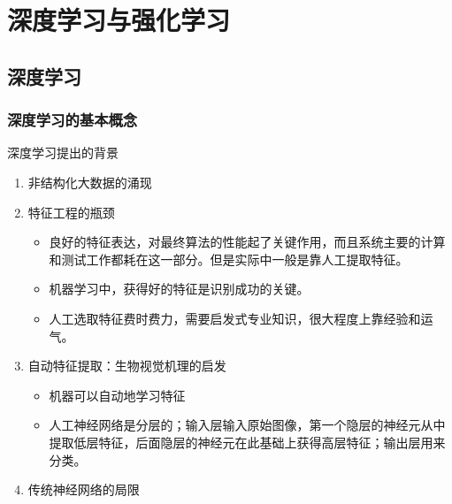 \section{深度学习与强化学习}

\subsection{深度学习}
\subsubsection{深度学习的基本概念}
\begin{note}
    深度学习提出的背景
    \begin{enumerate}
        \item 非结构化大数据的涌现
        
        \item 特征工程的瓶颈
        
        \begin{itemize}
            \item 良好的\textcolor{main1}{特征表达}，对最终算法的性能起了关键作用，而且系统主要的计算和测试工作都耗在这一部分。但是实际中一般是靠\textcolor{main1}{人工提取特征}。
            \item 机器学习中，获得好的特征是识别成功的关键。
            \item 人工选取特征费时费力，需要启发式专业知识，很大程度上靠经验和运气。
        \end{itemize}
        \item 自动特征提取：生物视觉机理的启发
        \begin{itemize}
            \item 机器可以自动地学习特征
            \item 人工神经网络是分层的；输入层输入原始图像，第一个隐层的神经元从中提取低层特征，后面隐层的神经元在此基础上获得高层特征；输出层用来分类。
        \end{itemize}
        \item 传统神经网络的局限
        

\end{enumerate}
\end{note}

